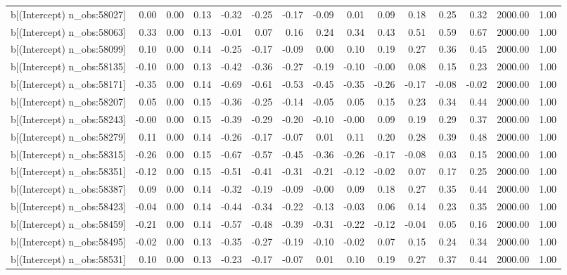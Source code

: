 \begin{table}[ht]
\begin{tabular}{rrrrrrrrrrrrrrr}
  b[(Intercept) n\_obs:58027] & 0.00 & 0.00 & 0.13 & -0.32 & -0.25 & -0.17 & -0.09 & 0.01 & 0.09 & 0.18 & 0.25 & 0.32 & 2000.00 & 1.00 \\ 
  b[(Intercept) n\_obs:58063] & 0.33 & 0.00 & 0.13 & -0.01 & 0.07 & 0.16 & 0.24 & 0.34 & 0.43 & 0.51 & 0.59 & 0.67 & 2000.00 & 1.00 \\ 
  b[(Intercept) n\_obs:58099] & 0.10 & 0.00 & 0.14 & -0.25 & -0.17 & -0.09 & 0.00 & 0.10 & 0.19 & 0.27 & 0.36 & 0.45 & 2000.00 & 1.00 \\ 
  b[(Intercept) n\_obs:58135] & -0.10 & 0.00 & 0.13 & -0.42 & -0.36 & -0.27 & -0.19 & -0.10 & -0.00 & 0.08 & 0.15 & 0.23 & 2000.00 & 1.00 \\ 
  b[(Intercept) n\_obs:58171] & -0.35 & 0.00 & 0.14 & -0.69 & -0.61 & -0.53 & -0.45 & -0.35 & -0.26 & -0.17 & -0.08 & -0.02 & 2000.00 & 1.00 \\ 
  b[(Intercept) n\_obs:58207] & 0.05 & 0.00 & 0.15 & -0.36 & -0.25 & -0.14 & -0.05 & 0.05 & 0.15 & 0.23 & 0.34 & 0.44 & 2000.00 & 1.00 \\ 
  b[(Intercept) n\_obs:58243] & -0.00 & 0.00 & 0.15 & -0.39 & -0.29 & -0.20 & -0.10 & -0.00 & 0.09 & 0.19 & 0.29 & 0.37 & 2000.00 & 1.00 \\ 
  b[(Intercept) n\_obs:58279] & 0.11 & 0.00 & 0.14 & -0.26 & -0.17 & -0.07 & 0.01 & 0.11 & 0.20 & 0.28 & 0.39 & 0.48 & 2000.00 & 1.00 \\ 
  b[(Intercept) n\_obs:58315] & -0.26 & 0.00 & 0.15 & -0.67 & -0.57 & -0.45 & -0.36 & -0.26 & -0.17 & -0.08 & 0.03 & 0.15 & 2000.00 & 1.00 \\ 
  b[(Intercept) n\_obs:58351] & -0.12 & 0.00 & 0.15 & -0.51 & -0.41 & -0.31 & -0.21 & -0.12 & -0.02 & 0.07 & 0.17 & 0.25 & 2000.00 & 1.00 \\ 
  b[(Intercept) n\_obs:58387] & 0.09 & 0.00 & 0.14 & -0.32 & -0.19 & -0.09 & -0.00 & 0.09 & 0.18 & 0.27 & 0.35 & 0.44 & 2000.00 & 1.00 \\ 
  b[(Intercept) n\_obs:58423] & -0.04 & 0.00 & 0.14 & -0.44 & -0.34 & -0.22 & -0.13 & -0.03 & 0.06 & 0.14 & 0.23 & 0.35 & 2000.00 & 1.00 \\ 
  b[(Intercept) n\_obs:58459] & -0.21 & 0.00 & 0.14 & -0.57 & -0.48 & -0.39 & -0.31 & -0.22 & -0.12 & -0.04 & 0.05 & 0.16 & 2000.00 & 1.00 \\ 
  b[(Intercept) n\_obs:58495] & -0.02 & 0.00 & 0.13 & -0.35 & -0.27 & -0.19 & -0.10 & -0.02 & 0.07 & 0.15 & 0.24 & 0.34 & 2000.00 & 1.00 \\ 
  b[(Intercept) n\_obs:58531] & 0.10 & 0.00 & 0.13 & -0.23 & -0.17 & -0.07 & 0.01 & 0.10 & 0.19 & 0.27 & 0.37 & 0.44 & 2000.00 & 1.00 \\ 

\end{tabular}
\end{table}
